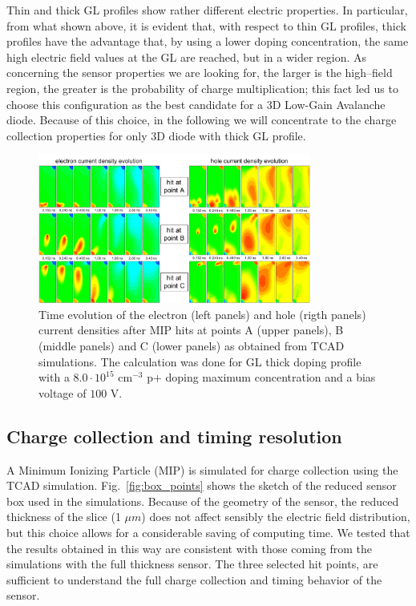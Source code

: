 \documentclass[aps,pt14,superscriptaddress,showpacs,floatfix,nofootinbib]{revtex4}
\begin{document}
Thin and thick GL profiles show rather different electric properties. In particular, from what shown above, it is evident that, with respect to thin GL profiles, thick profiles have the advantage that, by using a lower doping concentration, the same high electric field values at the GL are reached, but in a wider region. As concerning the sensor properties we are looking for, the larger is the high--field region, the greater is the probability of charge multiplication; this fact led us to choose this configuration as the best candidate for a 3D Low-Gain Avalanche diode. Because of this choice, in the following we will concentrate to the charge collection properties for only 3D diode with thick GL profile.

\begin{figure}[hbtp]
\begin{center}
\includegraphics[width=0.80\textwidth,keepaspectratio]{figures1/MIP_current_evolution_ABC.pdf}\hspace{0.7cm}
\caption{Time evolution of the electron (left panels) and hole (rigth panels) current densities after MIP hits at points A (upper panels), B (middle panels) and C (lower panels) as obtained from TCAD simulations. The calculation was done for GL thick doping profile with a $8.0\cdot 10^{15}$ cm$^{-3}$ p+ doping maximum concentration and a bias voltage of $100$ V.\label{fig:MIP-timeevolution}}  
\end{center}
\end{figure}



\subsection{Charge collection and timing resolution} 

A Minimum Ionizing Particle (MIP) is simulated for charge collection using the TCAD simulation. Fig.~\ref{fig:box_points} shows the sketch of the reduced sensor box used in the simulations. Because of the geometry of the sensor, the reduced thickness of the slice (1 $\mu m$) does not affect sensibly the electric field distribution, but this choice allows for a considerable saving of computing time. We tested that the results obtained in this way are consistent with those coming from the simulations with the full thickness sensor. The three selected hit points, are sufficient to understand the full charge collection and timing behavior of the sensor.    
 
\end{document}

